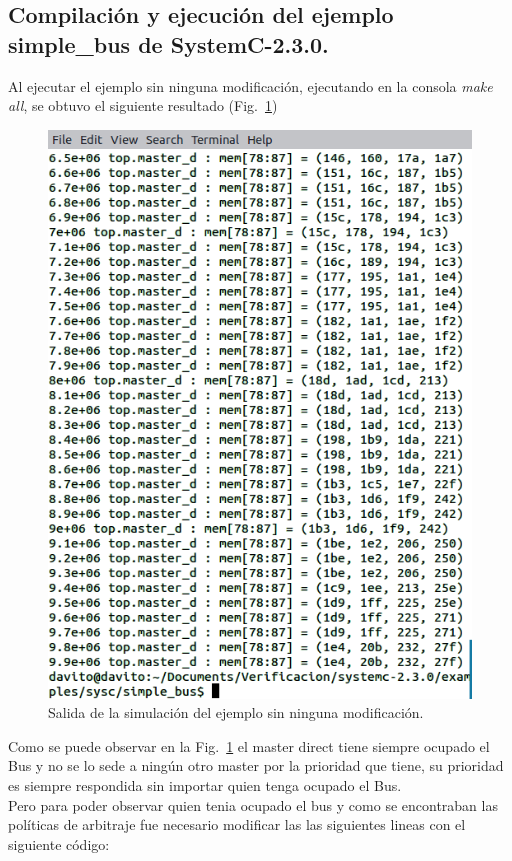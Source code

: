 \documentclass[twocolumn]{IEEEtran}
\begin{document}
\subsection{Compilación y ejecución del ejemplo simple\_bus de SystemC-2.3.0.}
\noindent
Al ejecutar el ejemplo sin ninguna modificación, ejecutando en la consola \textit{make all}, se obtuvo el siguiente resultado (Fig.~\ref{fig1})
\begin{figure}[H]
  \centering
    \includegraphics[scale=0.48]{fig1.png}
  \caption{Salida de la simulación del ejemplo sin ninguna modificación.}
 \label{fig1}
\end{figure}
\noindent
Como se puede observar en la Fig.~\ref{fig1} el master direct tiene siempre ocupado el Bus y no se lo sede a ningún otro master por la prioridad que tiene, su prioridad es siempre respondida sin importar quien tenga ocupado el Bus.\\
Pero para poder observar quien tenia ocupado el bus y como se encontraban las políticas de arbitraje fue necesario modificar las las siguientes lineas con el siguiente código:
\end{document}
